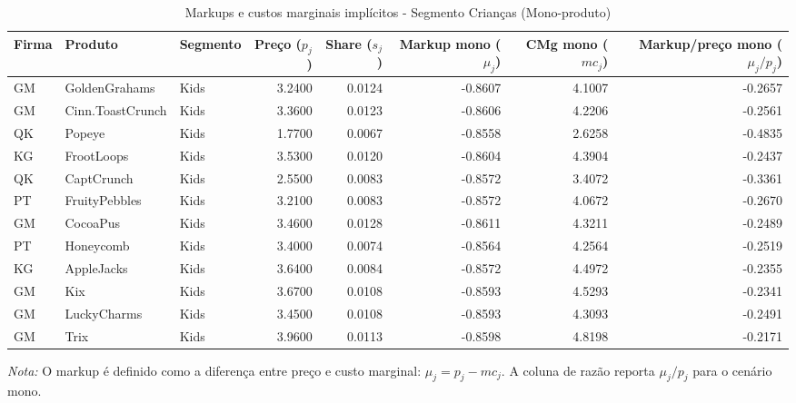 \begingroup
\begin{table}[H]
\centering
\caption{Markups e custos marginais implícitos - Segmento Crianças (Mono-produto)}
\label{tab:markups-kids-mono}
\scriptsize
\setlength{\tabcolsep}{3pt}
\renewcommand{\arraystretch}{1.05}
\begin{tabular}{@{}llp{}rrrrr@{}}
\toprule
Firma & Produto & Segmento & Preço ($p_j$) & Share ($s_j$) & Markup mono ($\mu_j$) & CMg mono ($mc_j$) & Markup/preço mono ($\mu_j/p_j$) \\
\midrule
GM & GoldenGrahams & Kids & 3.2400 & 0.0124 & -0.8607 & 4.1007 & -0.2657 \\
GM & Cinn.ToastCrunch & Kids & 3.3600 & 0.0123 & -0.8606 & 4.2206 & -0.2561 \\
QK & Popeye & Kids & 1.7700 & 0.0067 & -0.8558 & 2.6258 & -0.4835 \\
KG & FrootLoops & Kids & 3.5300 & 0.0120 & -0.8604 & 4.3904 & -0.2437 \\
QK & CaptCrunch & Kids & 2.5500 & 0.0083 & -0.8572 & 3.4072 & -0.3361 \\
PT & FruityPebbles & Kids & 3.2100 & 0.0083 & -0.8572 & 4.0672 & -0.2670 \\
GM & CocoaPus & Kids & 3.4600 & 0.0128 & -0.8611 & 4.3211 & -0.2489 \\
PT & Honeycomb & Kids & 3.4000 & 0.0074 & -0.8564 & 4.2564 & -0.2519 \\
KG & AppleJacks & Kids & 3.6400 & 0.0084 & -0.8572 & 4.4972 & -0.2355 \\
GM & Kix & Kids & 3.6700 & 0.0108 & -0.8593 & 4.5293 & -0.2341 \\
GM & LuckyCharms & Kids & 3.4500 & 0.0108 & -0.8593 & 4.3093 & -0.2491 \\
GM & Trix & Kids & 3.9600 & 0.0113 & -0.8598 & 4.8198 & -0.2171 \\
\bottomrule
\end{tabular}

\vspace{0.3em}
\scriptsize
\textit{Nota:} O markup é definido como a diferença entre preço e custo marginal: $\mu_j=p_j-mc_j$. A coluna de razão reporta $\mu_j/p_j$ para o cenário mono.
\end{table}
\endgroup


